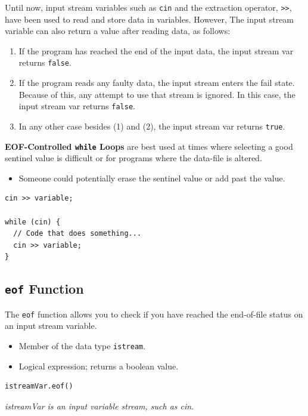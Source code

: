 \documentclass{article}
\begin{document}
Until now, input stream variables such as \texttt{cin} and the extraction
operator, \texttt{>>}, have been used to read and store data in variables.
However, The input stream variable can also return a value after reading data,
as follows:
\begin{enumerate}
  \item If the program has reached the end of the input data, the input stream
    var returns \texttt{false}.
  \item If the program reads any faulty data, the input stream enters the fail
    state. Because of this, any attempt to use that stream is ignored. In this
    case, the input stream var returns \texttt{false}.
  \item In any other case besides (1) and (2), the input stream var returns
    \texttt{true}.
\end{enumerate}

\textbf{EOF-Controlled \texttt{while} Loops} are best used at times where
selecting a good sentinel value is difficult or for programs where the data-file
is altered.
\begin{itemize}
  \item Someone could potentially erase the sentinel value or add past the
    value.
\end{itemize}

\begin{lstlisting}[caption={EOF-Controlled \texttt{while} Loop
  Example}]
cin >> variable;

while (cin) {
  // Code that does something...
  cin >> variable;
}
\end{lstlisting}


\subsection{\texttt{eof} Function}

The \texttt{eof} function allows you to check if you have reached the
end-of-file status on an input stream variable.
\begin{itemize}
  \item Member of the data type \texttt{istream}.
  \item Logical expression; returns a boolean value.
\end{itemize}

\begin{lstlisting}[caption={\texttt{eof} Function Syntax}]
istreamVar.eof()
\end{lstlisting}
\textit{istreamVar is an input variable stream, such as cin}.
\end{document}
